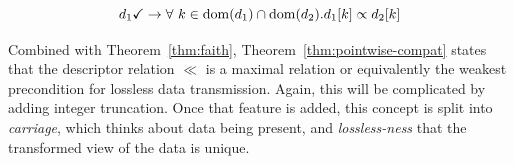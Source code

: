 \vspace{1em}
\begin{theorem}\label{thm:pointwise-compat}
  \[ d_1 \checkmark \rightarrow \forall\ k \in \mathrm{dom}(d_1) \cap \mathrm{dom}(d_2). d_1[k] \propto d_2[k] \] 
\end{theorem}

Combined with Theorem~\ref{thm:faith}, Theorem~\ref{thm:pointwise-compat} states
that the descriptor relation $\ll$ is a maximal relation or equivalently the
weakest precondition for lossless data transmission. Again, this will be
complicated by adding integer truncation. Once that feature is added, this
concept is split into \emph{carriage}, which thinks about data being
present, and \emph{lossless-ness} that the transformed view of the data is
unique. 

